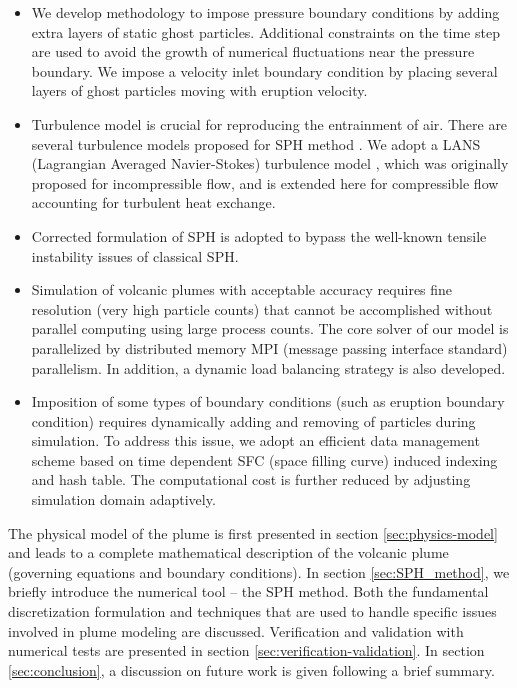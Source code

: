 \documentclass[gmd, manuscript]{copernicus}
\begin{document}
\begin{itemize}
\item We develop methodology to impose pressure boundary conditions by adding extra layers of static ghost particles. Additional constraints on the time step are used to avoid the growth of numerical fluctuations near the pressure boundary. We impose a velocity inlet boundary condition by placing several layers of ghost particles moving with eruption velocity. 
\item Turbulence model is crucial for reproducing the entrainment of air. There are several turbulence models proposed for SPH method \citep{issa2005numerical,violeau2007numerical}. We adopt a LANS (Lagrangian Averaged Navier-Stokes) turbulence model \citep{monaghan2011turbulence}, which was originally proposed for incompressible flow, and is extended here for compressible flow accounting for turbulent heat exchange. 
\item Corrected formulation of SPH \citep{chen1999improvement} is adopted to bypass the well-known tensile instability issues of classical SPH.
\item Simulation of volcanic plumes with acceptable accuracy requires fine resolution (very high particle counts) that cannot be accomplished without parallel computing using large process counts. The core solver of our model is parallelized by distributed memory MPI (message passing interface standard) parallelism. In addition, a dynamic load balancing strategy is also developed. 
\item Imposition of some types of boundary conditions (such as eruption boundary condition) requires dynamically adding and removing of particles during simulation. To address this issue, we adopt an efficient data management scheme based on time dependent SFC (space filling curve) induced indexing and hash table. The computational cost is further reduced by adjusting simulation domain adaptively.
\end{itemize}

The physical model of the plume is first presented in section \ref{sec:physics-model} and leads to a complete mathematical description of the volcanic plume (governing equations and boundary conditions). In section \ref{sec:SPH_method}, we  briefly introduce the numerical tool -- the SPH method. Both the fundamental discretization formulation and techniques that are used to handle specific issues involved in plume modeling are discussed. Verification and validation with numerical tests are presented in section \ref{sec:verification-validation}. In section \ref{sec:conclusion}, a discussion on future work is given following a brief summary.
\end{document}
